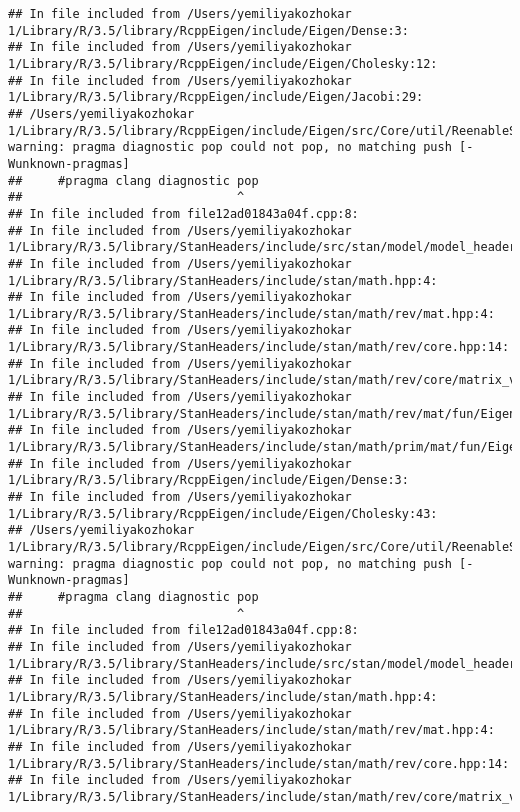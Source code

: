\documentclass[]{article}
\begin{document}
\begin{verbatim}
## In file included from /Users/yemiliyakozhokar 1/Library/R/3.5/library/RcppEigen/include/Eigen/Dense:3:
## In file included from /Users/yemiliyakozhokar 1/Library/R/3.5/library/RcppEigen/include/Eigen/Cholesky:12:
## In file included from /Users/yemiliyakozhokar 1/Library/R/3.5/library/RcppEigen/include/Eigen/Jacobi:29:
## /Users/yemiliyakozhokar 1/Library/R/3.5/library/RcppEigen/include/Eigen/src/Core/util/ReenableStupidWarnings.h:10:30: warning: pragma diagnostic pop could not pop, no matching push [-Wunknown-pragmas]
##     #pragma clang diagnostic pop
##                              ^
## In file included from file12ad01843a04f.cpp:8:
## In file included from /Users/yemiliyakozhokar 1/Library/R/3.5/library/StanHeaders/include/src/stan/model/model_header.hpp:4:
## In file included from /Users/yemiliyakozhokar 1/Library/R/3.5/library/StanHeaders/include/stan/math.hpp:4:
## In file included from /Users/yemiliyakozhokar 1/Library/R/3.5/library/StanHeaders/include/stan/math/rev/mat.hpp:4:
## In file included from /Users/yemiliyakozhokar 1/Library/R/3.5/library/StanHeaders/include/stan/math/rev/core.hpp:14:
## In file included from /Users/yemiliyakozhokar 1/Library/R/3.5/library/StanHeaders/include/stan/math/rev/core/matrix_vari.hpp:4:
## In file included from /Users/yemiliyakozhokar 1/Library/R/3.5/library/StanHeaders/include/stan/math/rev/mat/fun/Eigen_NumTraits.hpp:4:
## In file included from /Users/yemiliyakozhokar 1/Library/R/3.5/library/StanHeaders/include/stan/math/prim/mat/fun/Eigen.hpp:4:
## In file included from /Users/yemiliyakozhokar 1/Library/R/3.5/library/RcppEigen/include/Eigen/Dense:3:
## In file included from /Users/yemiliyakozhokar 1/Library/R/3.5/library/RcppEigen/include/Eigen/Cholesky:43:
## /Users/yemiliyakozhokar 1/Library/R/3.5/library/RcppEigen/include/Eigen/src/Core/util/ReenableStupidWarnings.h:10:30: warning: pragma diagnostic pop could not pop, no matching push [-Wunknown-pragmas]
##     #pragma clang diagnostic pop
##                              ^
## In file included from file12ad01843a04f.cpp:8:
## In file included from /Users/yemiliyakozhokar 1/Library/R/3.5/library/StanHeaders/include/src/stan/model/model_header.hpp:4:
## In file included from /Users/yemiliyakozhokar 1/Library/R/3.5/library/StanHeaders/include/stan/math.hpp:4:
## In file included from /Users/yemiliyakozhokar 1/Library/R/3.5/library/StanHeaders/include/stan/math/rev/mat.hpp:4:
## In file included from /Users/yemiliyakozhokar 1/Library/R/3.5/library/StanHeaders/include/stan/math/rev/core.hpp:14:
## In file included from /Users/yemiliyakozhokar 1/Library/R/3.5/library/StanHeaders/include/stan/math/rev/core/matrix_vari.hpp:4:

\end{verbatim}
\end{document}
